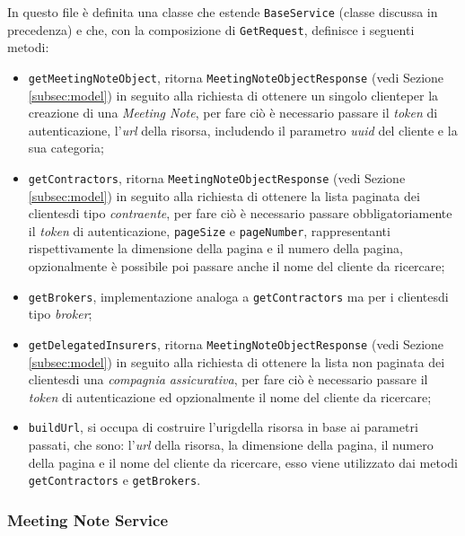In questo file è definita una classe che estende \lstinline{BaseService} (classe discussa in precedenza) e che, con la composizione di \lstinline{GetRequest}, definisce i seguenti metodi:
\begin{itemize}
    \item \lstinline{getMeetingNoteObject}, ritorna \lstinline{MeetingNoteObjectResponse} (vedi Sezione \ref{subsec:model}) in seguito alla richiesta di ottenere un singolo \gls{cliente}\glsoccur per la creazione di una \emph{Meeting Note}, per fare ciò è necessario passare il \emph{token} di autenticazione, l'\emph{url} della risorsa, includendo il parametro \emph{uuid} del cliente e la sua categoria;
    \item \lstinline{getContractors}, ritorna \lstinline{MeetingNoteObjectResponse} (vedi Sezione \ref{subsec:model}) in seguito alla richiesta di ottenere la lista paginata dei \glspl{cliente}\glsoccur di tipo \emph{contraente}, per fare ciò è necessario passare obbligatoriamente il \emph{token} di autenticazione, \lstinline{pageSize} e \lstinline{pageNumber}, rappresentanti rispettivamente la dimensione della pagina e il numero della pagina, opzionalmente è possibile poi passare anche il nome del \gls{cliente} da ricercare;
    \item \lstinline{getBrokers}, implementazione analoga a \lstinline{getContractors} ma per i \glspl{cliente}\glsoccur di tipo \emph{broker};
    \item \lstinline{getDelegatedInsurers}, ritorna \lstinline{MeetingNoteObjectResponse} (vedi Sezione \ref{subsec:model}) in seguito alla richiesta di ottenere la lista non paginata dei \glspl{cliente}\glsoccur di una \emph{compagnia assicurativa}, per fare ciò è necessario passare il \emph{token} di autenticazione ed opzionalmente il nome del \gls{cliente} da ricercare;
    \item \lstinline{buildUrl}, si occupa di costruire l'\gls{urig}\glsoccur della risorsa in base ai parametri passati, che sono: l'\emph{url} della risorsa, la dimensione della pagina, il numero della pagina e il nome del \gls{cliente} da ricercare, esso viene utilizzato dai metodi \lstinline{getContractors} e \lstinline{getBrokers}.
\end{itemize}

\subsubsection*{Meeting Note Service}
\label{subsubsec:meeting-note-service}

